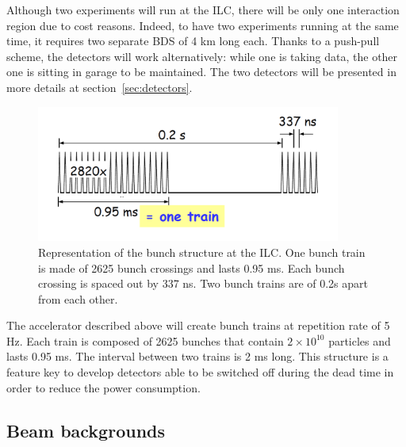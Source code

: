     Although two experiments will run at the \gls{ILC}, there will be only one interaction region due to cost reasons.
    Indeed, to have two experiments running at the same time, it requires two separate \gls{BDS} of 4 km long each.
    Thanks to a push-pull scheme, the detectors will work alternatively: while one is taking data, the other one is sitting in garage to be maintained.
    The two detectors will be presented in more details at section~\ref{sec:detectors}.
    
    \begin{figure}
      \centering
      \includegraphics[width = 10cm]{Pictures/bunch.png}
      \caption{Representation of the bunch structure at the ILC. One bunch train is made of 2625 bunch crossings and lasts 0.95 ms. Each bunch crossing is spaced out by 337 ns. Two bunch trains are of 0.2s apart from each other.}
      \label{fig:bunches}
    \end{figure}

    The accelerator described above will create bunch trains at repetition rate of 5 Hz. 
    Each train is composed of 2625 bunches that contain $2\times 10^{10}$ particles and lasts 0.95 ms. 
    The interval between two trains is 2 ms long. 
    This structure is a feature key to develop detectors able to be switched off during the dead time in order to reduce the power consumption.

    \subsection{Beam backgrounds}

